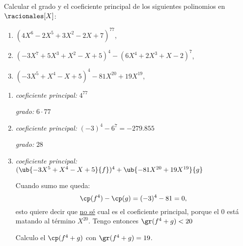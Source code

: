 \begin{enunciado}{\ejercicio}
  Calcular el grado y el coeficiente principal de los siguientes polinomios en $\racionales[X]$:
  \begin{enumerate}[label=\roman*)]
    \item $(4X^6 - 2X^5 + 3X^2 - 2X + 7)^{77}$,
    \item $(-3X^7 + 5X^3 + X^2 - X + 5)^4 - (6X^4 + 2X^3 + X - 2)^7$,
    \item $(-3X^5 + X^4 - X + 5)^4 - 81X^{20} + 19X^{19}$,
  \end{enumerate}

\end{enunciado}

\begin{enumerate}[label=\roman*)]
  \item \textit{coeficiente principal: } $4^{77}$

        \textit{grado: } $6\cdot 77$

  \item \textit{coeficiente principal: } $(-3)^4 - 6^7 = -279.855$

        \textit{grado: } $28$

  \item \textit{coeficiente principal: }
        $(\ub{-3X^5 + X^4 - X + 5}{f})^4 + \ub{-81X^{20} + 19X^{19}}{g}$

        Cuando sumo me queda:
        $$
          \cp(f^4) - \cp(g) = (-3)^4 - 81 = 0,
        $$
        esto quiere decir que \ul{no sé} cual es el coeficiente principal, porque el $0$ está matando al término $X^{20}$.
        Tengo entonces $\gr(f^4 + g) < 20$

        Calculo el $\cp(f^4+g)$ con $\gr(f^4 + g ) = 19$.


\end{enumerate}
